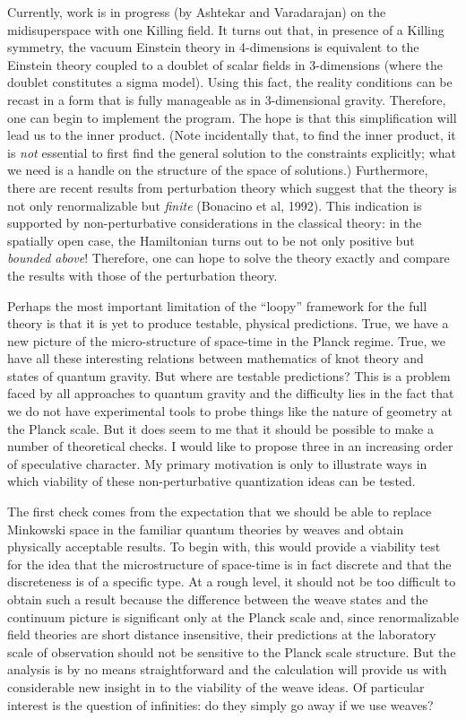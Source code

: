 Currently, work is in progress (by Ashtekar and Varadarajan) on the
midisuperspace with one Killing
field. It turns out that, in presence of a Killing symmetry, the vacuum
Einstein theory in 4-dimensions is equivalent to the Einstein theory
coupled to a doublet of scalar fields in 3-dimensions (where the doublet
constitutes a sigma model). Using this fact, the reality conditions can be
recast in a form that is fully manageable as in 3-dimensional gravity.
Therefore, one can begin to implement the program. The hope is that this
simplification will lead us to the inner product. (Note incidentally that,
to find the inner product, it is {\it not} essential to first find the general
solution to the constraints explicitly; what we need is a handle on the
structure of the space of solutions.) Furthermore, there are recent results
from perturbation theory which suggest that the theory is not only
renormalizable but {\it finite} (Bonacino et al, 1992).
This indication is supported by non-perturbative considerations in the
classical theory: in the spatially open case, the Hamiltonian turns out to
be not only positive but {\it bounded above}! Therefore, one can hope to
solve the theory exactly and compare the results with those of the
perturbation theory.

Perhaps the most important limitation of the ``loopy'' framework for the
full theory is that it is yet to produce testable, physical predictions.
True, we have a new picture of the micro-structure of space-time in the Planck
regime. True, we have all these interesting relations between mathematics of
knot theory and states of quantum gravity. But where are testable predictions?
This is a problem faced by all approaches to quantum gravity and the difficulty
lies in the fact that we do not have experimental tools to probe things like
the nature of geometry at the Planck scale. But it does seem to me that it
should be possible to make a number of theoretical checks. I would like to
propose three in an increasing order of speculative character. My primary
motivation is only to illustrate ways in which viability of these
non-perturbative quantization ideas can be tested.

The first check comes from the expectation that we should be able to replace
Minkow\-ski space in the familiar quantum theories
by weaves and obtain physically acceptable results. To begin with, this would
provide a viability test for the idea that the microstructure of space-time
is in fact discrete and that the discreteness is of a specific type. At a
rough level, it should not be too difficult to obtain such a result because
the difference between the weave states and the continuum picture is
significant only at the Planck scale and, since renormalizable field theories
are short distance insensitive, their predictions at the laboratory scale of
observation should not be sensitive to the Planck scale structure. But the
analysis is by no means straightforward and the calculation will provide us
with considerable new insight in to the viability of the weave ideas. Of
particular interest is the question of infinities: do they simply go away
if we use weaves?


